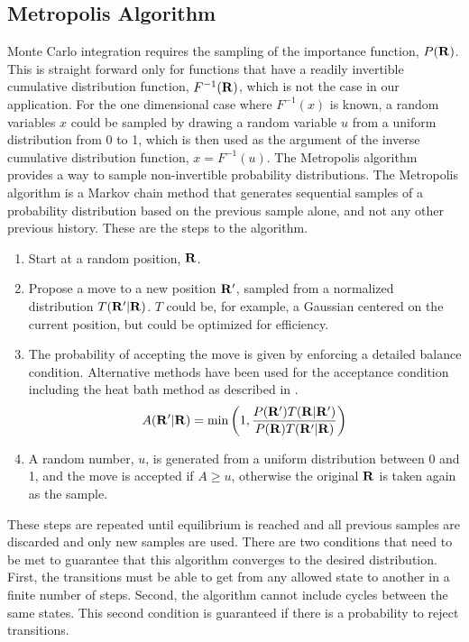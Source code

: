 \subsection{Metropolis Algorithm}
Monte Carlo integration requires the sampling of the importance function, $P(\mathbf{R})$. This is straight forward only for functions that have a readily invertible cumulative distribution function, $F^{-1}(\mathbf{R})$, which is not the case in our application. For the one dimensional case where $F^{-1}(x)$ is known, a random variables $x$ could be sampled by drawing a random variable $u$ from a uniform distribution from 0 to 1, which is then used as the argument of the inverse cumulative distribution function, $x=F^{-1}(u)$. The Metropolis algorithm provides a way to sample non-invertible probability distributions. The Metropolis algorithm is a Markov chain method that generates sequential samples of a probability distribution based on the previous sample alone, and not any other previous history. These are the steps to the algorithm.
\begin{enumerate}
   \item Start at a random position, $\mathbf{R}$.
   \item Propose a move to a new position $\mathbf{R}'$, sampled from a normalized distribution $T(\mathbf{R}'|\mathbf{R})$. $T$ could be, for example, a Gaussian centered on the current position, but could be optimized for efficiency.
   \item The probability of accepting the move is given by enforcing a detailed balance condition. Alternative methods have been used for the acceptance condition including the heat bath method as described in \cite{sethna2006}.
   \begin{equation}
      A(\mathbf{R}'|\mathbf{R}) = \mathrm{min}\left(1, \frac{P(\mathbf{R}')T(\mathbf{R}|\mathbf{R}')}{P(\mathbf{R})T(\mathbf{R}'|\mathbf{R})}\right)
   \end{equation}
   \item A random number, $u$, is generated from a uniform distribution between 0 and 1, and the move is accepted if $A\ge u$, otherwise the original $\mathbf{R}$ is taken again as the sample.
\end{enumerate}

These steps are repeated until equilibrium is reached and all previous samples are discarded and only new samples are used. There are two conditions that need to be met to guarantee that this algorithm converges to the desired distribution. First, the transitions must be able to get from any allowed state to another in a finite number of steps. Second, the algorithm cannot include cycles between the same states. This second condition is guaranteed if there is a probability to reject transitions.

